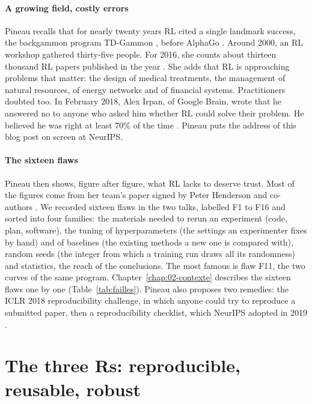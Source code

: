 \paragraph{A growing field, costly errors}
Pineau recalls that for nearly twenty years RL cited a single landmark success, the backgammon program
TD-Gammon \parencite{tesauro1995tdgammon}, before AlphaGo \parencite{silver2016alphago}. Around 2000,
an RL workshop gathered thirty-five people. For 2016, she counts about thirteen thousand RL papers
published in the year \parencite{pineau2018iclr}. She adds that RL is approaching problems that
matter: the design of medical treatments, the management of natural resources, of energy networks and
of financial systems. Practitioners doubted too. In February 2018, Alex Irpan, of Google
Brain, wrote that he answered no to anyone who asked him whether RL could solve their problem. He
believed he was right at least 70\% of the time \parencite{irpan2018rlhard}. Pineau puts the address of
this blog post on screen at NeurIPS.

\paragraph{The sixteen flaws}
Pineau then shows, figure after figure, what RL lacks to deserve trust. Most of the figures come from
her team's paper signed by Peter Henderson and co-authors \parencite{henderson2018matters}. We recorded
sixteen flaws in the two talks, labelled F1 to F16 and sorted into four families: the materials needed
to rerun an experiment (code, plan, software), the tuning of hyperparameters (the settings an
experimenter fixes by hand) and of baselines (the existing methods a new one is compared with), random
seeds (the integer from which a training run draws all its randomness) and statistics, the reach of the
conclusions. The most famous is flaw F11, the two curves of the same program.
Chapter~\ref{chap:02-contexte} describes the sixteen flaws one by one
(Table~\ref{tab:failles}). Pineau also proposes two remedies: the ICLR 2018
reproducibility challenge, in which anyone could try to reproduce a submitted paper, then a
reproducibility checklist, which NeurIPS adopted in 2019 \parencite{pineau2021improving}.

\section{The three Rs: reproducible, reusable, robust}\label{sec:intro-trois-r}

